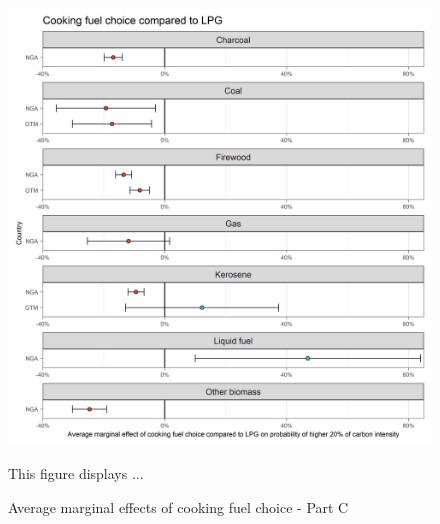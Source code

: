 \documentclass[12pt, a4paper]{article}
\newenvironment{subcaption}
{\strut
\vspace{-5pt}
\begin{minipage}[b]{0.9\textwidth}
  \hspace*{-\parindent}
  \footnotesize}
 {\end{minipage}}
\begin{document}
 \begin{figure}[ht!]
   \centering
   \caption{Average marginal effects of cooking fuel choice - Part C} \label{fig:F8_LPG}
   \includegraphics{Analysis_Logit_Models_Marginal_Effects/Average_Marginal_Effects_affected_upper_80_CF_LPG}
   \begin{subcaption}
     This figure displays ...
   \end{subcaption}
 \end{figure}

 \clearpage
\end{document}
